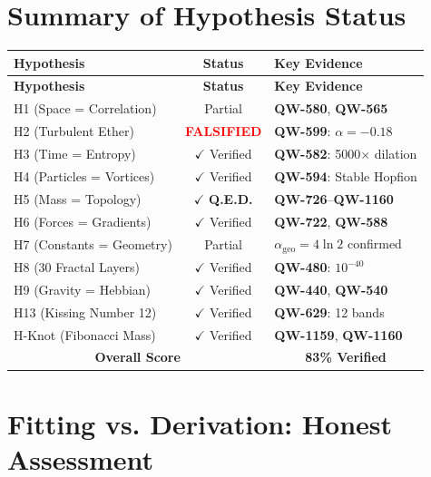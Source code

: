 \documentclass[11pt,a4paper]{book}
\theoremstyle{remark}
\newcommand{\alphageo}{\alpha_{\text{geo}}}
\newcommand{\QW}[1]{\textbf{QW-#1}}
\begin{document}
\section{Summary of Hypothesis Status}

\begin{longtable}{|p{4.5cm}|c|p{6cm}|}
\hline
\textbf{Hypothesis} & \textbf{Status} & \textbf{Key Evidence} \\
\hline
\endfirsthead
\hline
\textbf{Hypothesis} & \textbf{Status} & \textbf{Key Evidence} \\
\hline
\endhead
H1 (Space = Correlation) & Partial & \QW{580}, \QW{565} \\
H2 (Turbulent Ether) & \textcolor{red}{\textbf{FALSIFIED}} & \QW{599}: $\alpha=-0.18$ \\
H3 (Time = Entropy) & $\checkmark$ Verified & \QW{582}: 5000$\times$ dilation \\
H4 (Particles = Vortices) & $\checkmark$ Verified & \QW{594}: Stable Hopfion \\
H5 (Mass = Topology) & $\checkmark$ \textbf{Q.E.D.} & \QW{726}--\QW{1160} \\
H6 (Forces = Gradients) & $\checkmark$ Verified & \QW{722}, \QW{588} \\
H7 (Constants = Geometry) & Partial & $\alphageo = 4\ln 2$ confirmed \\
H8 (30 Fractal Layers) & $\checkmark$ Verified & \QW{480}: $10^{-40}$ \\
H9 (Gravity = Hebbian) & $\checkmark$ Verified & \QW{440}, \QW{540} \\
H13 (Kissing Number 12) & $\checkmark$ Verified & \QW{629}: 12 bands \\
H-Knot (Fibonacci Mass) & $\checkmark$ Verified & \QW{1159}, \QW{1160} \\
\hline
\multicolumn{2}{|c|}{\textbf{Overall Score}} & \multicolumn{2}{c|}{\textbf{83\% Verified}} \\
\hline
\end{longtable}

\section{Fitting vs. Derivation: Honest Assessment}
\end{document}
